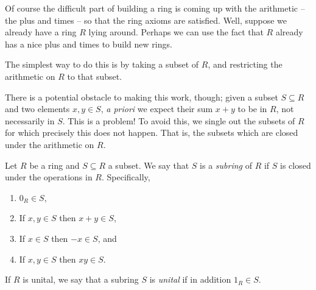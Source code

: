 \documentclass{article}
\begin{document}

\begin{center}
\end{center}

Of course the difficult part of building a ring is coming up with the arithmetic -- the plus and times -- so that the ring axioms are satisfied. Well, suppose we already have a ring $R$ lying around. Perhaps we can use the fact that $R$ already has a nice plus and times to build new rings.

\begin{center}
\end{center}

The simplest way to do this is by taking a subset of $R$, and restricting the arithmetic on $R$ to that subset.

There is a potential obstacle to making this work, though; given a subset $S \subseteq R$ and two elements $x,y \in S$, \emph{a priori} we expect their sum $x+y$ to be in $R$, not necessarily in $S$. This is a problem! To avoid this, we single out the subsets of $R$ for which precisely this does not happen. That is, the subsets which are closed under the arithmetic on $R$.

\begin{center}
\end{center}

\begin{dfn}[Subring]
Let $R$ be a ring and $S \subseteq R$ a subset. We say that $S$ is a \emph{subring} of $R$ if $S$ is closed under the operations in $R$. Specifically,
\begin{enumerate}
\item $0_R \in S$,
\item If $x,y \in S$ then $x+y \in S$,
\item If $x \in S$ then $-x \in S$, and
\item If $x,y \in S$ then $xy \in S$.
\end{enumerate}
If $R$ is unital, we say that a subring $S$ is \emph{unital} if in addition $1_R \in S$. 
\end{dfn}
\end{document}
